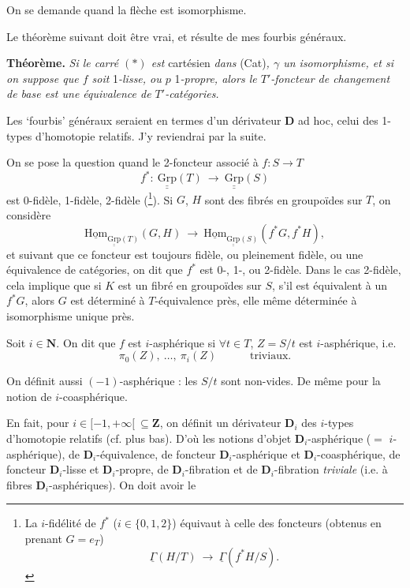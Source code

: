 \documentclass[11pt]{article}
\newcommand{\printedpage}[1]{\marginpar{\footnotesize p.~#1}}
\newcommand{\msp}[1]{\marginpar{\footnotesize [#1]}}
\newcommand{\uHom}{\underline{\mathrm{Hom}}}
\newcommand{\uuGrp}{\underline{\underline{\mathrm{Grp}}}}
\newcommand{\fl}{\longrightarrow}
\begin{document}
On se demande quand la flèche est isomorphisme.

\msp{page 7}
Le théorème suivant doit être vrai, et résulte de mes fourbis généraux.

\textbf{Théorème.} \textit{Si le carré $(*)$ est} cartésien \textit{dans} (Cat)\textit{, $\gamma$ un isomorphisme, et si on suppose que $f$ soit} 1\textit{-lisse, ou $p$} 1\textit{-propre, alors le $T'$-foncteur de changement de base est une équivalence de $T'$-catégories.}

Les ‘fourbis’ généraux seraient en termes d'un dérivateur $\mathbf{D}$ ad hoc, celui des 1-types d'homotopie relatifs. J'y reviendrai par la suite.

On se pose la question quand le 2-foncteur associé à $f : S \fl T$
\[
f^* :\ \uuGrp(T) \ \fl\ \uuGrp(S)
\]
\printedpage{7}
est 0-fidèle, 1-fidèle, 2-fidèle (\footnote[2]{La $i$-fidélité de $f^*$ ($i \in \{0,1,2\}$) équivaut à celle des foncteurs (obtenus en prenant $G = e_T$)
\[
\underline{\Gamma}(H/T) \ \fl\ \underline{\Gamma}(f^*H/S).
\]}). Si $G$, $H$ sont des fibrés en groupoïdes sur $T$, on considère
\[
\uHom_{\uuGrp(T)}(G,H) \ \fl\ \uHom_{\uuGrp(S)}(f^*G, f^*H),
\]
et suivant que ce foncteur est toujours fidèle, ou pleinement fidèle, ou une équivalence de catégories, on dit que $f^*$ est 0-, 1-, ou 2-fidèle. Dans le cas 2-fidèle, cela implique que si $K$ est un fibré en groupoïdes sur $S$, s'il est équivalent à un $f^*G$, alors $G$ est déterminé à $T$-équivalence près, elle même déterminée à isomorphisme unique près.

\msp{page 8}
Soit $i \in \mathbf{N}$. On dit que $f$ est $i$-asphérique si $\forall t \in T$, $Z = S/t$ est $i$-asphérique, i.e.
\[
\pi_0(Z),\ \dots,\ \pi_i(Z) \qquad\quad \text{triviaux.}
\tag*{$(*)$}
\]

On définit aussi $(-1)$-asphérique : les $S/t$ sont non-vides. De même pour la notion de $i$-coasphérique.

En fait, pour $i \in [-1,+\infty[ \ \subseteq \mathbf{Z}$, on définit un dérivateur $\mathbf{D}_i$ des $i$-types d'homotopie relatifs (cf. plus bas). D'où les notions d'objet $\mathbf{D}_i$-asphérique ($=$ $i$-asphérique), de $\mathbf{D}_i$-équivalence, de foncteur $\mathbf{D}_i$-asphérique et $\mathbf{D}_i$-coasphérique, de foncteur $\mathbf{D}_i$-lisse et $\mathbf{D}_i$-propre, de $\mathbf{D}_i$-fibration et de $\mathbf{D}_i$-fibration \textit{triviale} (i.e. à fibres $\mathbf{D}_i$-asphériques). On doit avoir le
\end{document}
